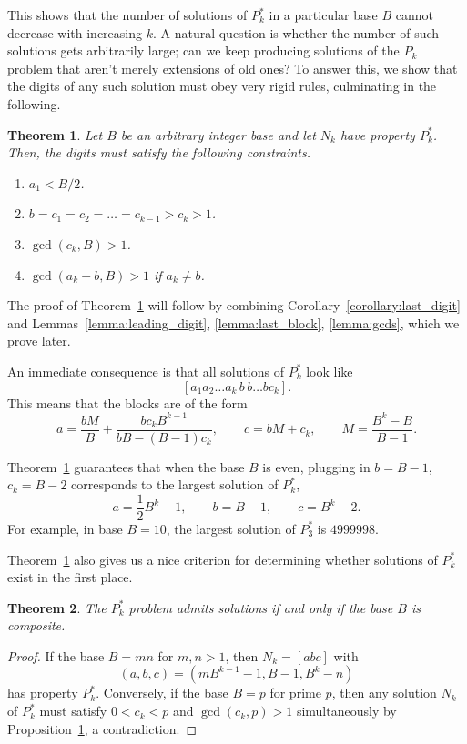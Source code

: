 \documentclass[sn-mathphys]{sn-jnl}%
\theoremstyle{thmstyleone}%
\newtheorem{theorem}{Theorem}%
\theoremstyle{thmstyletwo}%
\theoremstyle{thmstylethree}%
\begin{document}
This shows that the number of solutions of $P^*_k$
in a particular base $B$ cannot decrease with increasing $k$. A natural question is
whether the number of such solutions gets arbitrarily large; can we keep producing
solutions of the $P_k$ problem that aren't merely extensions of old ones? To answer
this, we show that the digits of any such solution must obey very rigid rules,
culminating in the following.

\begin{theorem} \label{theorem:structure}
    Let $B$ be an arbitrary integer base and let $N_k$ have property 
    $P^*_k$.
    Then, the digits must satisfy the following constraints.
    \begin{enumerate}
        \item $a_1 < B / 2$.
        \item $b = c_1 = c_2 = \dots = c_{k - 1} > c_k > 1$.
        \item $\gcd(c_k, B) > 1$.
        \item $\gcd(a_k - b, B) > 1$ if $a_k \neq b$.
    \end{enumerate}
\end{theorem}

The proof of Theorem~\ref{theorem:structure} will follow by combining
Corollary~\ref{corollary:last_digit} and Lemmas~\ref{lemma:leading_digit},
\ref{lemma:last_block}, \ref{lemma:gcds}, which we prove later.

An immediate consequence is that all solutions of $P^*_k$ look like \[
    [a_1a_2\dots a_k \,b\, b\dots b c_k].
\] This means that the blocks are of the form \[
    a = \frac{bM}{B} + \frac{bc_kB^{k - 1}}{bB - (B - 1)c_k}, \qquad 
    c = bM + c_k, \qquad
    M = \frac{B^k - B}{B - 1}.
\]

Theorem~\ref{theorem:structure} guarantees that when the base $B$ is even, plugging
in $b = B - 1$, $c_k = B - 2$ corresponds to the largest solution of $P^*_k$, \[
    a = \frac{1}{2}B^k - 1, \qquad b = B - 1, \qquad c = B^k - 2.
\] For example, in base $B = 10$, the largest solution of $P^*_3$ is $4999998$.

Theorem~\ref{theorem:structure} also gives us a nice criterion for determining whether
solutions of $P^*_k$ exist in the first place.

\begin{theorem} \label{theorem:prime_composite}
    The $P^*_k$ problem admits solutions if and only if the base $B$ is composite.
\end{theorem}
\begin{proof}
    If the base $B = mn$ for $m, n > 1$, then $N_k = [abc]$ with \[
        (a, b, c) = (mB^{k - 1} - 1, B - 1, B^k - n)
    \] has property $P^*_k$.
    Conversely, if the base $B = p$ for prime $p$, then any solution $N_k$ of 
    $P^*_k$ must satisfy $0 < c_k < p$ and $\gcd(c_k, p) > 1$ simultaneously by
    Proposition~\ref{theorem:structure}, a contradiction.
\end{proof}
\end{document}
